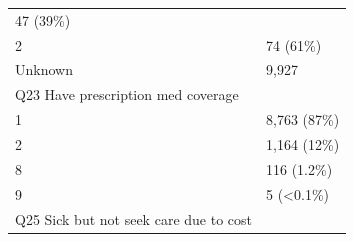 \documentclass[]{article}
\begin{document}
\begin{longtable}[]{@{}ll@{}}
\begin{minipage}[t]{0.23\columnwidth}
47 (39\%)\strut
\end{minipage}\tabularnewline
\begin{minipage}[t]{0.71\columnwidth}\raggedright
2\strut
\end{minipage} & \begin{minipage}[t]{0.23\columnwidth}\raggedright
74 (61\%)\strut
\end{minipage}\tabularnewline
\begin{minipage}[t]{0.71\columnwidth}\raggedright
Unknown\strut
\end{minipage} & \begin{minipage}[t]{0.23\columnwidth}\raggedright
9,927\strut
\end{minipage}\tabularnewline
\begin{minipage}[t]{0.71\columnwidth}\raggedright
Q23 Have prescription med coverage\strut
\end{minipage} & \begin{minipage}[t]{0.23\columnwidth}\raggedright
\strut
\end{minipage}\tabularnewline
\begin{minipage}[t]{0.71\columnwidth}\raggedright
1\strut
\end{minipage} & \begin{minipage}[t]{0.23\columnwidth}\raggedright
8,763 (87\%)\strut
\end{minipage}\tabularnewline
\begin{minipage}[t]{0.71\columnwidth}\raggedright
2\strut
\end{minipage} & \begin{minipage}[t]{0.23\columnwidth}\raggedright
1,164 (12\%)\strut
\end{minipage}\tabularnewline
\begin{minipage}[t]{0.71\columnwidth}\raggedright
8\strut
\end{minipage} & \begin{minipage}[t]{0.23\columnwidth}\raggedright
116 (1.2\%)\strut
\end{minipage}\tabularnewline
\begin{minipage}[t]{0.71\columnwidth}\raggedright
9\strut
\end{minipage} & \begin{minipage}[t]{0.23\columnwidth}\raggedright
5 (\textless0.1\%)\strut
\end{minipage}\tabularnewline
\begin{minipage}[t]{0.71\columnwidth}\raggedright
Q25 Sick but not seek care due to cost\strut
\end{minipage} & \begin{minipage}[t]{0.23\columnwidth}\raggedright

\end{minipage}
\end{longtable}
\end{document}
